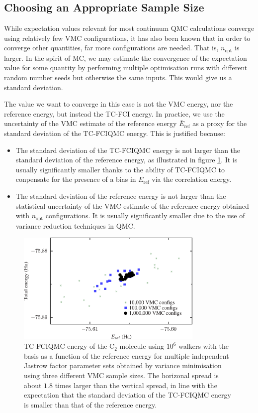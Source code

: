 \subsection{Choosing an Appropriate Sample Size}

While expectation values relevant for most continuum QMC calculations converge using relatively few VMC configurations, it has also been known that in order to converge other quantities, far more configurations are needed. That is, $n_\mathrm{opt}$ is larger. In the spirit of \gls{MC}, we may estimate the convergence of the expectation value for some quantity by performing multiple optimisation runs with different random number seeds but otherwise the same inputs. This would give us a standard deviation.

The value we want to converge in this case is not the VMC energy, nor the reference energy, but instead the TC-FCI energy. In practice, we use the uncertainty of the VMC estimate of the reference energy $\bar E_\mathrm{ref}$ as a proxy for the standard deviation of the TC-FCIQMC energy. This is justified because:
\begin{itemize}
    \item The standard deviation of the TC-FCIQMC energy is not larger than the standard deviation of the reference energy, as illustrated in figure \ref{fig:spread_c2_cc-pvdz}. It is usually significantly smaller thanks to the ability of TC-FCIQMC to conpensate for the presence of a bias in $E_\mathrm{ref}$ via the correlation energy.
    \item The standard deviation of the reference energy is not larger than the statistical uncertainty of the VMC estimate of the reference energy obtained with $n_\mathrm{opt}$ configurations. It is usually significantly smaller due to the use of variance reduction techniques in QMC.
\end{itemize}

\begin{figure}[htbp]
    \centering
    \includegraphics[width=0.8\textwidth]{figures/optimisation/Fig/spread_c2_cc-pvdz}
    \caption{TC-FCIQMC energy of the C$_2$ molecule using $10^6$ walkers with the \vdz basis as a function of the reference energy for multiple independent Jastrow factor parameter sets obtained by variance minimisation using three different VMC sample sizes. The horizonal spread is about $1.8$ times larger than the vertical spread, in line with the expectation that the standard deviation of the TC-FCIQMC energy is smaller than that of the reference energy.}
    \label{fig:spread_c2_cc-pvdz}
\end{figure}

